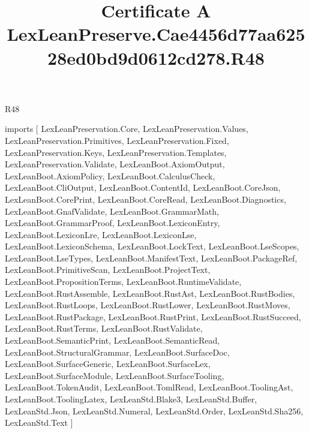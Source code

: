 \begin{lexlean}{R48}
\title{Certificate A LexLeanPreserve.Cae4456d77aa62528ed0bd9d0612cd278.R48}
\begin{coremodule}
imports [
  LexLeanPreservation.Core,
  LexLeanPreservation.Values,
  LexLeanPreservation.Primitives,
  LexLeanPreservation.Fixed,
  LexLeanPreservation.Keys,
  LexLeanPreservation.Templates,
  LexLeanPreservation.Validate,
  LexLeanBoot.AxiomOutput,
  LexLeanBoot.AxiomPolicy,
  LexLeanBoot.CalculusCheck,
  LexLeanBoot.CliOutput,
  LexLeanBoot.ContentId,
  LexLeanBoot.CoreJson,
  LexLeanBoot.CorePrint,
  LexLeanBoot.CoreRead,
  LexLeanBoot.Diagnostics,
  LexLeanBoot.GnafValidate,
  LexLeanBoot.GrammarMath,
  LexLeanBoot.GrammarProof,
  LexLeanBoot.LexiconEntry,
  LexLeanBoot.LexiconLre,
  LexLeanBoot.LexiconLse,
  LexLeanBoot.LexiconSchema,
  LexLeanBoot.LockText,
  LexLeanBoot.LseScopes,
  LexLeanBoot.LseTypes,
  LexLeanBoot.ManifestText,
  LexLeanBoot.PackageRef,
  LexLeanBoot.PrimitiveScan,
  LexLeanBoot.ProjectText,
  LexLeanBoot.PropositionTerms,
  LexLeanBoot.RuntimeValidate,
  LexLeanBoot.RustAssemble,
  LexLeanBoot.RustAst,
  LexLeanBoot.RustBodies,
  LexLeanBoot.RustLoops,
  LexLeanBoot.RustLower,
  LexLeanBoot.RustMoves,
  LexLeanBoot.RustPackage,
  LexLeanBoot.RustPrint,
  LexLeanBoot.RustSucceed,
  LexLeanBoot.RustTerms,
  LexLeanBoot.RustValidate,
  LexLeanBoot.SemanticPrint,
  LexLeanBoot.SemanticRead,
  LexLeanBoot.StructuralGrammar,
  LexLeanBoot.SurfaceDoc,
  LexLeanBoot.SurfaceGeneric,
  LexLeanBoot.SurfaceLex,
  LexLeanBoot.SurfaceModule,
  LexLeanBoot.SurfaceTooling,
  LexLeanBoot.TokenAudit,
  LexLeanBoot.TomlRead,
  LexLeanBoot.ToolingAst,
  LexLeanBoot.ToolingLatex,
  LexLeanStd.Blake3,
  LexLeanStd.Buffer,
  LexLeanStd.Json,
  LexLeanStd.Numeral,
  LexLeanStd.Order,
  LexLeanStd.Sha256,
  LexLeanStd.Text
]


\end{coremodule}
\end{lexlean}

